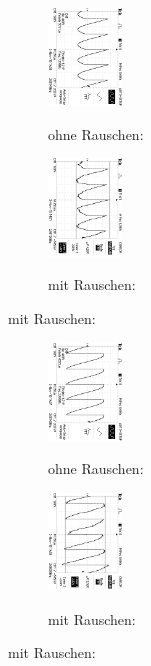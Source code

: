 \begin{figure}
\caption{$U_{out} (\phi = 210°$)}
\begin{subfigure}{0.48\textwidth}
\centering
\caption*{ohne Rauschen:}
\includegraphics[angle=90,height=2.6cm]{graphics/ALL0036/F0036TEK.jpg}
\label{fig:phi210o}
\end{subfigure}
\begin{subfigure}{0.48\textwidth}
\centering
\caption*{mit Rauschen:}
\includegraphics[angle=90,height=2.6cm]{graphics/ALL0044/F0044TEK.jpg}
\label{fig:phi210m}
\end{subfigure}
\end{figure}
\addtocounter{figure}{-1}
\begin{figure}
\caption{$U_{out} (\phi = 270°$)}
\begin{subfigure}{0.48\textwidth}
\centering
\caption*{ohne Rauschen:}
\includegraphics[angle=90,height=2.6cm]{graphics/ALL0035/F0035TEK.jpg}
\label{fig:phi270o}
\end{subfigure}
\begin{subfigure}{0.48\textwidth}
\centering
\caption*{mit Rauschen:}
\includegraphics[angle=90,height=2.6cm]{graphics/ALL0043/F0043TEK.jpg}
\label{fig:phi270m}
\end{subfigure}
\end{figure}
\addtocounter{figure}{-1}
